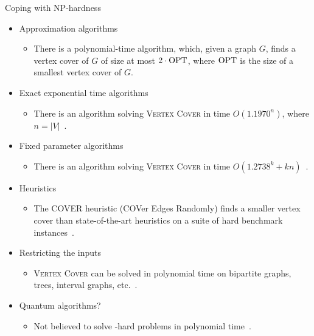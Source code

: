 \begin{frame}{Coping with NP-hardness}
 \begin{itemize}
  \item Approximation algorithms
  \begin{itemize}
	\item There is a polynomial-time algorithm, which, given a graph $G$, finds a vertex cover of $G$ of size at most $2\cdot \text{\normalfont OPT}$, where $\text{\normalfont OPT}$ is the size of a smallest vertex cover of $G$.
  \end{itemize}
  \item Exact exponential time algorithms
  \begin{itemize}
    \item There is an algorithm solving \textsc{Vertex Cover} in time $O(1.1970^n)$, where $n=|V|$~\cite{XiaoN17}.
  \end{itemize}
  \item Fixed parameter algorithms
  \begin{itemize}
    \item There is an algorithm solving \textsc{Vertex Cover} in time $O(1.2738^k+kn)$~\cite{ChenKX10}.
  \end{itemize}
  \item Heuristics
  \begin{itemize}
    \item The COVER heuristic (COVer Edges Randomly) finds a smaller vertex cover than state-of-the-art heuristics on a suite of hard benchmark instances~\cite{RichterHG07}.
  \end{itemize}
  \item Restricting the inputs
  \begin{itemize}
    \item \textsc{Vertex Cover} can be solved in polynomial time on bipartite graphs, trees, interval graphs, etc.~\cite{Golumbic04}.
  \end{itemize}
  \item Quantum algorithms?
  \begin{itemize}
   \item Not believed to solve \NP-hard problems in polynomial time~\cite{Aaronson05}.
  \end{itemize}
 \end{itemize}
\end{frame}

